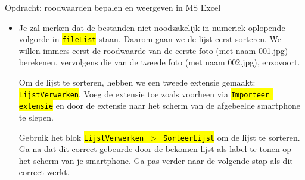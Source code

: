 \begin{opdracht}{Opdracht: roodwaarden bepalen en weergeven in MS Excel}
\begin{enumerate}
\begin{itemize}
			Hiervoor moet je een extensie gebruiken: \hl{\texttt{TaifunFile}}. Voeg in de \hl{\texttt{Designer}}-view de extensie toe in de tab \hl{\emph{Palet}} via \hl{\texttt{Importeer extensie}}. Sleep de extensie dan naar het afgebeelde smartphone-scherm. De extensie zou onder de afgebeelde smartphone moeten verschijnen. 
			
			In de \emph{Blocks}-view gebruik je het blok \hl{\texttt{TaifunFile - FileListAsync}} om alle bestanden in de genoteerde map op te lijsten. Dit blok gaat alle bestanden in de gevraagde map \hl{\texttt{directoryName}} en met de gevraagde extensie \hl{\texttt{extension}} oplijsten. Als je bij \hl{\texttt{includeSubDirectories}} \texttt{true} zet, worden ook submappen meegenomen in de oplijsting. Als \hl{\texttt{includeSubDirectories}} \texttt{false} is, wordt enkel de map zelf bekeken. 

			De oplijsting is \emph{asynchroon}: dat wil zeggen dat de smartphone andere processen kan uitvoeren tijdens de oplijsting. Maar dat betekent ook dat we niet weten wanneer de bestanden opgelijst zijn. Daarom gebruiken we ook het blok \hl{\texttt{TaifunFile - AfterFileListAsync}}. Dit blok treedt in werking wanneer alle bestanden opgelijst zijn, en dan kunnen we verder met onze berekeningen. Binnen dit blok hebben we een variabele \hl{\texttt{fileList}} waarin alle bestanden in de gevraagde map met de gevraagde extensie opgenomen zijn.
			
			Ga even na af de oplijsting van de bestanden in de gevraagde map correct is verlopen. Dit doe je door de variabele \hl{\texttt{fileList}} als label te tonen op het scherm van je smartphone. Ga pas verder naar de volgende stap als je zeker bent dat dit juist is.
			
			\item Je zal merken dat de bestanden niet noodzakelijk in numeriek oplopende volgorde in \hl{\texttt{fileList}} staan. Daarom gaan we de lijst eerst sorteren. We willen immers eerst de roodwaarde van de eerste foto (met naam 001.jpg) berekenen, vervolgens die van de tweede foto (met naam 002.jpg), enzovoort.
			
			Om de lijst te sorteren, hebben we een tweede extensie gemaakt: \hl{\texttt{LijstVerwerken}}. Voeg de extensie toe zoals voorheen via \hl{\texttt{Importeer extensie}} en door de extensie naar het scherm van de afgebeelde smartphone te slepen.
			
			Gebruik het blok \hl{\texttt{LijstVerwerken $>$ SorteerLijst}} om de lijst te sorteren. Ga na dat dit correct gebeurde door de bekomen lijst als label te tonen op het scherm van je smartphone. Ga pas verder naar de volgende stap als dit correct werkt.
			

\end{itemize}
\end{enumerate}
\end{opdracht}

